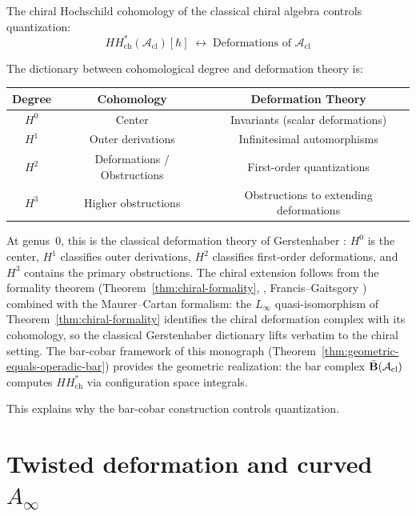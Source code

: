 \begin{theorem}\label{thm:master-identity-deformation}
The chiral Hochschild cohomology of the classical chiral algebra controls quantization:
\[
HH^*_{\mathrm{ch}}(\mathcal{A}_{\mathrm{cl}})[\hbar]
\;\leftrightarrow\;
\text{Deformations of } \mathcal{A}_{\mathrm{cl}}
\]

The dictionary between cohomological degree and deformation theory is:
\begin{center}
\begin{tabular}{|c|c|c|}
\hline
Degree & Cohomology & Deformation Theory \\
\hline
$H^0$ & Center & Invariants (scalar deformations) \\
$H^1$ & Outer derivations & Infinitesimal automorphisms \\
$H^2$ & Deformations / Obstructions & First-order quantizations \\
$H^3$ & Higher obstructions & Obstructions to extending deformations \\
\hline
\end{tabular}
\end{center}
\end{theorem}

\begin{remark}[Provenance]\label{rem:master-identity-scope}
At genus~$0$, this is the classical deformation theory of Gerstenhaber
\cite{Ger64}: $H^0$ is the center, $H^1$ classifies outer derivations,
$H^2$ classifies first-order deformations, and $H^3$ contains the
primary obstructions.  The chiral extension follows from the formality
theorem (Theorem~\ref{thm:chiral-formality}, \ClaimStatusProvedElsewhere,
Francis--Gaitsgory \cite{FG12}) combined with the Maurer--Cartan formalism: the
$L_\infty$ quasi-isomorphism of Theorem~\ref{thm:chiral-formality}
identifies the chiral deformation complex with its cohomology, so
the classical Gerstenhaber dictionary lifts verbatim to the chiral
setting.  The bar-cobar framework of this monograph
(Theorem~\ref{thm:geometric-equals-operadic-bar}) provides the
geometric realization: the bar complex $\bar{\mathbf{B}}(\mathcal{A}_{\mathrm{cl}})$
computes $HH^*_{\mathrm{ch}}$ via configuration space integrals.
\end{remark}

This explains why the bar-cobar construction controls quantization.

\section{\texorpdfstring{Twisted deformation and curved $A_\infty$}{Twisted deformation and curved A-}}

